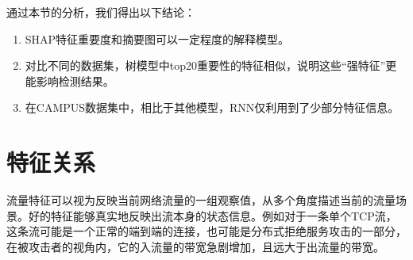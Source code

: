 
通过本节的分析，我们得出以下结论：
\begin{enumerate}
  \item SHAP特征重要度和摘要图可以一定程度的解释模型。
  \item 对比不同的数据集，树模型中top20重要性的特征相似，说明这些“强特征”更能影响检测结果。
  \item 在CAMPUS数据集中，相比于其他模型，RNN仅利用到了少部分特征信息。
\end{enumerate}




\section{特征关系}
流量特征可以视为反映当前网络流量的一组观察值，从多个角度描述当前的流量场景。好的特征能够真实地反映出流本身的状态信息。例如对于一条单个TCP流，这条流可能是一个正常的端到端的连接，也可能是分布式拒绝服务攻击的一部分，在被攻击者的视角内，它的入流量的带宽急剧增加，且远大于出流量的带宽。

